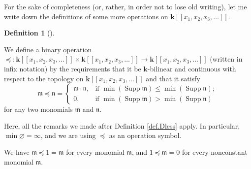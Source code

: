 \documentclass[numbers=enddot,12pt,final,onecolumn,notitlepage,abstracton]{scrartcl}%
\theoremstyle{definition}
\newtheorem{defi}[theo]{Definition}
\newenvironment{definition}[1][]
{\begin{defi}[#1]\begin{leftbar}}
{\end{leftbar}\end{defi}}
\newenvironment{verlong}{}{}
\begin{document}
\begin{verlong}
For the sake of completeness (or, rather, in order not to lose old writing),
let me write down the definitions of some more operations on $\mathbf{k}%
\left[  \left[  x_{1},x_{2},x_{3},\ldots\right]  \right]  $.

\begin{definition}
We define a binary operation $\left.  \preceq\right.  :\mathbf{k}\left[
\left[  x_{1},x_{2},x_{3},\ldots\right]  \right]  \times\mathbf{k}\left[
\left[  x_{1},x_{2},x_{3},\ldots\right]  \right]  \rightarrow\mathbf{k}\left[
\left[  x_{1},x_{2},x_{3},\ldots\right]  \right]  $ (written in infix
notation) by the requirements that it be $\mathbf{k}$-bilinear and continuous
with respect to the topology on $\mathbf{k}\left[  \left[  x_{1},x_{2}%
,x_{3},\ldots\right]  \right]  $ and that it satisfy%
\[
\mathfrak{m}\left.  \preceq\right.  \mathfrak{n}=
\begin{cases}
\mathfrak{m}\cdot\mathfrak{n}, & \text{if }\min\left(  \operatorname*{Supp}%
\mathfrak{m}\right)  \leq\min\left(  \operatorname*{Supp}\mathfrak{n}\right)
;\\
0, & \text{if }\min\left(  \operatorname*{Supp}\mathfrak{m}\right)
>\min\left(  \operatorname*{Supp}\mathfrak{n}\right)
\end{cases}
\]
for any two monomials $\mathfrak{m}$ and $\mathfrak{n}$.
\end{definition}

Here, all the remarks we made after Definition \ref{def.Dless} apply. In
particular, $\min\varnothing=\infty$, and we are using $\left.  \preceq
\right.  $ as an operation symbol.

We have $\mathfrak{m}\left.  \preceq\right.  1=\mathfrak{m}$ for every
monomial $\mathfrak{m}$, and $1\left.  \preceq\right.  \mathfrak{m}=0$ for
every nonconstant monomial $\mathfrak{m}$.


\end{verlong}
\end{document}
